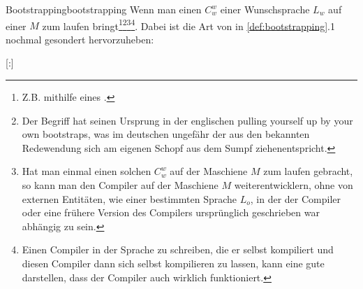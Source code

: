 \begin{Definition}{Bootstrapping}{bootstrapping}
  Wenn man einen  $C_{w}^{w}$ einer Wunschsprache $L_w$ auf einer  $M$ zum laufen bringt\footnote{Z.B. mithilfe eines .}\footnote{Der Begriff hat seinen Ursprung in der englischen  \glqq pulling yourself up by your own bootstraps\grqq, was im deutschen ungefähr der aus den  bekannten Redewendung \glqq sich am eigenen Schopf aus dem Sumpf ziehen\grqq entspricht.}\footnote{Hat man einmal einen solchen  $C_{w}^{w}$ auf der Maschiene $M$ zum laufen gebracht, so kann man den Compiler auf der Maschiene $M$ weiterentwicklern, ohne von externen Entitäten, wie einer bestimmten Sprache $L_o$, in der der Compiler oder eine frühere Version des Compilers ursprünglich geschrieben war abhängig zu sein.}\footnote{Einen Compiler in der Sprache zu schreiben, die er selbst kompiliert und diesen Compiler dann sich selbst kompilieren zu lassen, kann eine gute  darstellen, dass der Compiler auch wirklich funktioniert.}. Dabei ist die Art von  in \ref{def:bootstrapping}{.1} nochmal gesondert hervorzuheben:

  \titleformat{\paragraph}[runin]{\normalfont\normalsize\bfseries}{}{0mm}{}[:]


\end{Definition}
